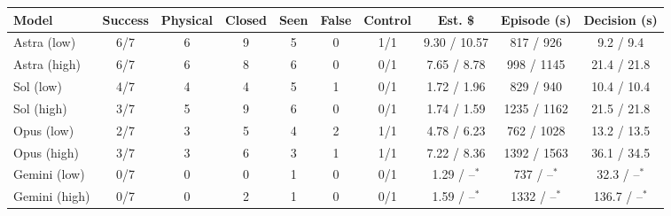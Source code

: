 \begin{tabular}{lccccccccc}
\toprule
Model & Success & Physical & Closed & Seen & False & Control & Est. \$ & Episode (s) & Decision (s) \\
\midrule
Astra (low) & 6/7 & 6 & 9 & 5 & 0 & 1/1 & 9.30 / 10.57 & 817 / 926 & 9.2 / 9.4 \\
Astra (high) & 6/7 & 6 & 8 & 6 & 0 & 0/1 & 7.65 / 8.78 & 998 / 1145 & 21.4 / 21.8 \\
Sol (low) & 4/7 & 4 & 4 & 5 & 1 & 0/1 & 1.72 / 1.96 & 829 / 940 & 10.4 / 10.4 \\
Sol (high) & 3/7 & 5 & 9 & 6 & 0 & 0/1 & 1.74 / 1.59 & 1235 / 1162 & 21.5 / 21.8 \\
Opus (low) & 2/7 & 3 & 5 & 4 & 2 & 1/1 & 4.78 / 6.23 & 762 / 1028 & 13.2 / 13.5 \\
Opus (high) & 3/7 & 3 & 6 & 3 & 1 & 1/1 & 7.22 / 8.36 & 1392 / 1563 & 36.1 / 34.5 \\
Gemini (low) & 0/7 & 0 & 0 & 1 & 0 & 0/1 & 1.29 / --$^{*}$ & 737 / --$^{*}$ & 32.3 / --$^{*}$ \\
Gemini (high) & 0/7 & 0 & 2 & 1 & 0 & 0/1 & 1.59 / --$^{*}$ & 1332 / --$^{*}$ & 136.7 / --$^{*}$ \\
\bottomrule
\end{tabular}

